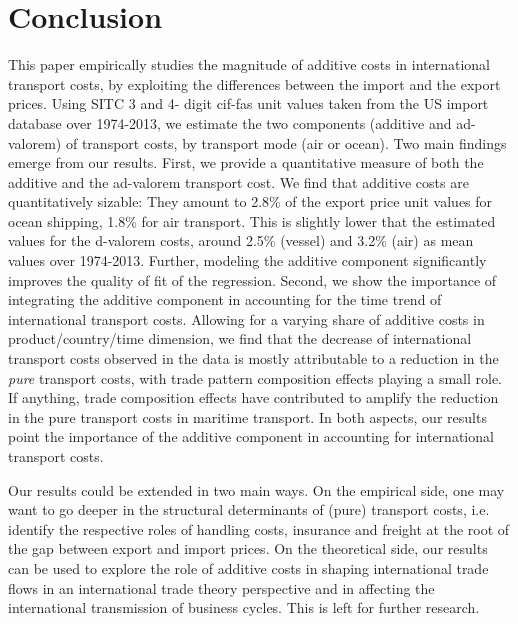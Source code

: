 \documentclass[a4paper,11pt]{article}
\begin{document}
\section{Conclusion \label{sec:conclu}}

This paper empirically studies the magnitude of additive costs in international transport costs, by exploiting the differences between the import and the export prices.
Using SITC 3 and 4- digit cif-fas unit values taken from the US import database over 1974-2013, we estimate the two components (additive and ad-valorem) of transport costs, by transport mode (air or ocean).
Two main findings emerge from our results.
First, we provide a quantitative measure of both the additive and the ad-valorem transport cost.
We find that additive costs are quantitatively sizable: They amount to 2.8\% of the export price unit values for ocean shipping, 1.8\% for air transport.
This is slightly lower that the estimated values for the d-valorem costs, around  2.5\% (vessel) and 3.2\% (air) as mean values over 1974-2013.
Further, modeling the additive component significantly improves the quality of fit of the regression.
Second, we show the importance of integrating the additive component in accounting for the time trend of international transport costs.
Allowing for a varying share of additive costs in product/country/time dimension, we find that the decrease of international transport costs observed in the data is mostly attributable to a reduction in the \textit{pure} transport costs, with trade pattern composition effects playing a small role.
If anything, trade composition effects have contributed to amplify the reduction in the pure transport costs in maritime transport.
In both aspects, our results point the importance of the additive component in accounting for international transport costs.

Our results could be extended in two main ways.
On the empirical side, one may want to go deeper in the structural determinants of (pure) transport costs, i.e.
identify the respective roles of handling costs, insurance and freight at the root of the gap between export and import prices.
On the theoretical side, our results can be used to explore the role of additive costs in shaping international trade flows in an international trade theory perspective and in affecting the international transmission of business cycles.
This is left for further research.



\newpage


\end{document}
